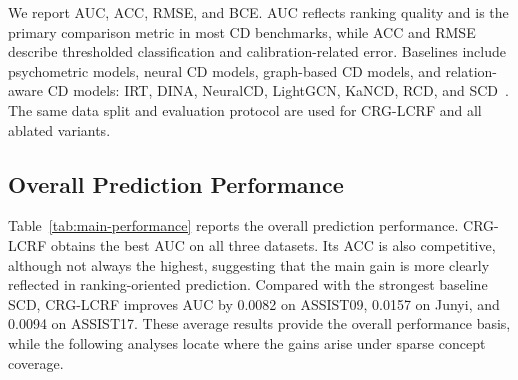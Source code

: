 \documentclass[conference]{IEEEtran}
\begin{document}
We report AUC, ACC, RMSE, and BCE. AUC reflects ranking quality and is the primary comparison metric in most CD benchmarks, while ACC and RMSE describe thresholded classification and calibration-related error. Baselines include psychometric models, neural CD models, graph-based CD models, and relation-aware CD models: IRT, DINA, NeuralCD, LightGCN, KaNCD, RCD, and SCD~\cite{lord1980irt,delatorre2009dina,wang2020ncdm,he2020lightgcn,wang2022kscd,gao2021rcd,wang2023scd}. The same data split and evaluation protocol are used for CRG-LCRF and all ablated variants.

\subsection{Overall Prediction Performance}
\begin{table}[H]
\centering
\caption{Overall prediction performance.}
\label{tab:main-performance}
\scriptsize
\setlength{\tabcolsep}{2.4pt}
\end{table}

Table~\ref{tab:main-performance} reports the overall prediction performance. CRG-LCRF obtains the best AUC on all three datasets. Its ACC is also competitive, although not always the highest, suggesting that the main gain is more clearly reflected in ranking-oriented prediction. Compared with the strongest baseline SCD, CRG-LCRF improves AUC by 0.0082 on ASSIST09, 0.0157 on Junyi, and 0.0094 on ASSIST17. These average results provide the overall performance basis, while the following analyses locate where the gains arise under sparse concept coverage.
\end{document}
